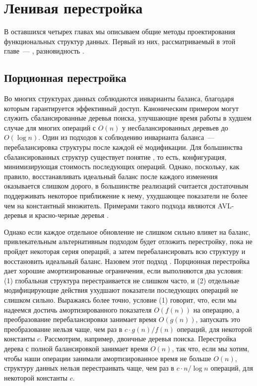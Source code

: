 \chapter{Ленивая перестройка}
\label{ch:8}

В оставшихся четырех главах мы описываем общие методы проектирования
функциональных структур данных.  Первый из них, рассматриваемый в этой
главе~--- , разновидность
 \cite{Overmars1983}.

\section{Порционная перестройка}

Во многих структурах данных соблюдаются инварианты баланса, благодаря
которым гарантируется эффективный доступ. Каноническим примером могут
служить сбалансированные деревья поиска, улучшающие время работы в
худшем случае для многих операций с $O(n)$ у несбалансированных
деревьев до $O(\log n)$. Один из подходов к соблюдению инварианта
баланса~--- перебалансировка структуры после каждой её
модификации. Для большинства сбалансированных структур существует
понятие , то есть,
конфигурация, минимизирующая стоимость последующих операций. Однако,
поскольку, как правило, восстанавливать идеальный баланс после
каждого изменения оказывается слишком дорого, в большинстве реализаций
считается достаточным поддерживать некоторое приближение к нему,
ухудшающее показатели не более чем на константный множитель. Примерами
такого подхода являются AVL-деревья \cite{AdelsonVelskiiLandis1962}
и красно-черные деревья \cite{GuibasSedgewick1978}.

Однако если каждое отдельное обновление не слишком сильно влияет на
баланс, привлекательным альтернативным подходом будет отложить
перестройку, пока не пройдет некоторая серия операций, а затем
перебалансировать всю структуру и восстановить идеальный
баланс. Назовем этот подход . Порционная перестройка дает хорошие амортизированные
ограничения, если выполняются два условия: (1) глобальная структура
перестраивается не слишком часто, и (2) отдельные модифицирующие
действия ухудшают показатели последующих операций не слишком
сильно. Выражаясь более точно, условие (1) говорит, что, если мы
надеемся достичь амортизированного показателя $O(f(n))$ на операцию, а
преобразование перебалансировки занимает время $O(g(n))$, запускать
это преобразование нельзя чаще, чем раз в $c \cdot g(n) / f(n)$
операций, для некоторой константы $c$. Рассмотрим, например, двоичные
деревья поиска. Перестройка дерева с полной балансировкой занимает
время $O(n)$, так что, если мы хотим, чтобы наши операции занимали
амортизированное время не больше $O(n)$, структуру данных нельзя
перестраивать чаще, чем раз в $c \cdot n / \log n$ операций, для
некоторой константы $c$.

